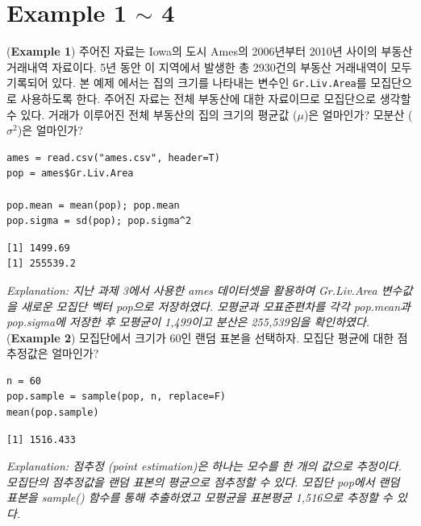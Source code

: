 \documentclass{article}
\begin{document}
\pagestyle{fancy}

\section*{Example 1 $\sim$ 4}

(\textbf{Example 1}) 주어진 자료는 Iowa의 도시 Ames의 2006년부터 2010년 사이의 부동산 거래내역 자료이다.
5년 동안 이 지역에서 발생한 총 2930건의 부동산 거래내역이 모두 기록되어 있다. 본 예제
에서는 집의 크기를 나타내는 변수인 \texttt{Gr.Liv.Area}를 모집단으로 사용하도록 한다. 주어진 자료는 전체 부동산에 대한 자료이므로 모집단으로 생각할 수 있다. 거래가
이루어진 전체 부동산의 집의 크기의 평균값 ($\mu$)은 얼마인가? 모분산 ($\sigma^2$)은 얼마인가?
\begin{lstlisting}[style={r-style}]
ames = read.csv("ames.csv", header=T)
pop = ames$Gr.Liv.Area

pop.mean = mean(pop); pop.mean
pop.sigma = sd(pop); pop.sigma^2
\end{lstlisting}
\begin{lstlisting}[style={out-style}]
[1] 1499.69
[1] 255539.2
\end{lstlisting}
\emph{Explanation: 지난 과제 3에서 사용한 ames 데이터셋을 활용하여 Gr.Liv.Area 변수값을 새로운 모집단 벡터 pop으로 저장하였다. 모평균과 모표준편차를 각각 pop.mean과 pop.sigma에 저장한 후 모평균이 1,499이고 분산은 255,539임을 확인하였다. } \\

(\textbf{Example 2}) 모집단에서 크기가 60인 랜덤 표본을 선택하자. 모집단 평균에 대한 점추정값은 얼마인가?
\begin{lstlisting}[style={r-style}]
n = 60
pop.sample = sample(pop, n, replace=F)
mean(pop.sample)
\end{lstlisting}
\begin{lstlisting}[style={out-style}]
[1] 1516.433
\end{lstlisting}
\emph{Explanation: 점추정 (point estimation)은 하나는 모수를 한 개의 값으로 추정이다. 모집단의 점추정값을 랜덤 표본의 평균으로 점추정할 수 있다. 모집단 pop에서 랜덤 표본을 sample() 함수를 통해 추출하였고 모평균을 표본평균 1,516으로 추정할 수 있다.} \\
\end{document}
